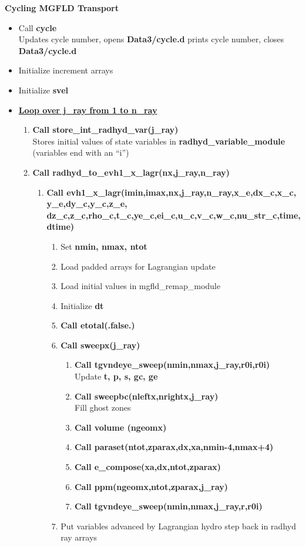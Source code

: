 \documentclass[11pt,doublespace]{article}
\begin{document}
{\bf Cycling MGFLD Transport}
 \begin{itemize}
  \item Call {\bf cycle}\\
  Updates cycle number, opens {\bf Data3/cycle.d} prints cycle number, closes {\bf Data3/cycle.d}
  \item Initialize increment arrays
  \item Initialize {\bf svel}
  \item {\bf {\underline{Loop over j\_ray from 1 to n\_ray}}}
 \begin{enumerate}
 \item {\bf Call store\_int\_radhyd\_var(j\_ray)}\\
  Stores initial values of state variables in {\bf radhyd\_variable\_module} (variables end with an ``i'')
  \item {\bf Call radhyd\_to\_evh1\_x\_lagr(nx,j\_ray,n\_ray)}
\begin{enumerate}
  \item {\bf Call evh1\_x\_lagr(imin,imax,nx,j\_ray,n\_ray,x\_e,dx\_c,x\_c,
y\_e,dy\_c,y\_c,z\_e,\\
  dz\_c,z\_c,rho\_c,t\_c,ye\_c,ei\_c,u\_c,v\_c,w\_c,nu\_str\_c,time,dtime)}
\begin{enumerate}
  \item Set {\bf nmin, nmax, ntot}
  \item Load padded arrays for Lagrangian update
  \item Load initial values in mgfld\_remap\_module
  \item Initialize {\bf dt}
  \item {\bf Call etotal(.false.)}
  \item {\bf Call sweepx(j\_ray)}
\begin{enumerate}
  \item {\bf Call tgvndeye\_sweep(nmin,nmax,j\_ray,r0i,r0i)}\\
  Update {\bf t, p, s, gc, ge}
  \item {\bf Call sweepbc(nleftx,nrightx,j\_ray)}\\
  Fill ghost zones
  \item {\bf Call volume (ngeomx)}
  \item {\bf Call paraset(ntot,zparax,dx,xa,nmin-4,nmax+4)}
  \item {\bf Call e\_compose(xa,dx,ntot,zparax)}
  \item {\bf Call ppm(ngeomx,ntot,zparax,j\_ray)}
  \item {\bf Call tgvndeye\_sweep(nmin,nmax,j\_ray,r,r0i)}
\end{enumerate}
  \item Put variables advanced by Lagrangian hydro step back in radhyd ray arrays
\end{enumerate}
\end{enumerate}
\end{enumerate}


\end{itemize}
\end{document}

